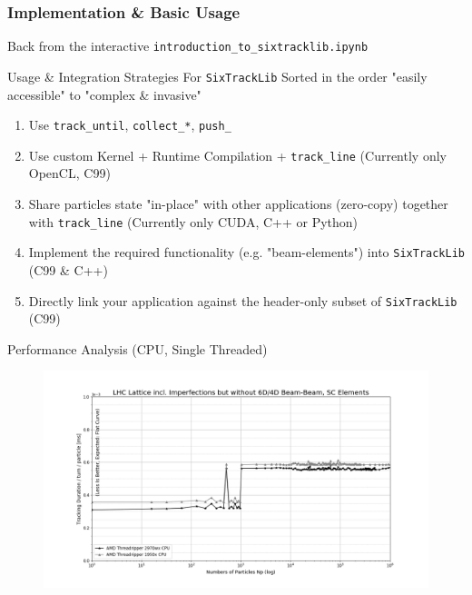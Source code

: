 \documentclass{beamer}
\begin{document}
\begin{frame}[label=endintro1]
    \frametitle{Implementation \& Basic Usage}
    \begin{center}
    \Large{Back from the interactive \texttt{introduction\_to\_sixtracklib.ipynb}}
    \\[2em]
    \hyperlink{beginintro1}{}
\end{center}
\end{frame}

\begin{frame}{Usage \& Integration Strategies For \texttt{SixTrackLib}}
Sorted in the order "easily accessible" to "complex \& invasive"
\begin{enumerate}
    \item<1->Use \texttt{track\_until\(\)}, \texttt{collect\_*}, \texttt{push_\*}
    \item<4->Use custom Kernel + Runtime Compilation + \texttt{track\_line\(\)} (Currently only OpenCL, C99)
    \item<5->Share particles state "in-place" with other applications (zero-copy) together with \texttt{track\_line\(\)} (Currently only CUDA,
    C++ or Python)
    \item<3->Implement the required functionality (e.g. "beam-elements") into \texttt{SixTrackLib} (C99 \& C++)
    \item<2->Directly link your application against the header-only subset of \texttt{SixTrackLib} (C99)
\end{enumerate}
\end{frame}


\begin{frame}{Performance Analysis (CPU, Single Threaded)}
\begin{figure}[h]
    \centering 
    \includegraphics[width=1.1\textwidth]{images/performance_analysis_01.png}
\end{figure}
\end{frame}
\end{document}
